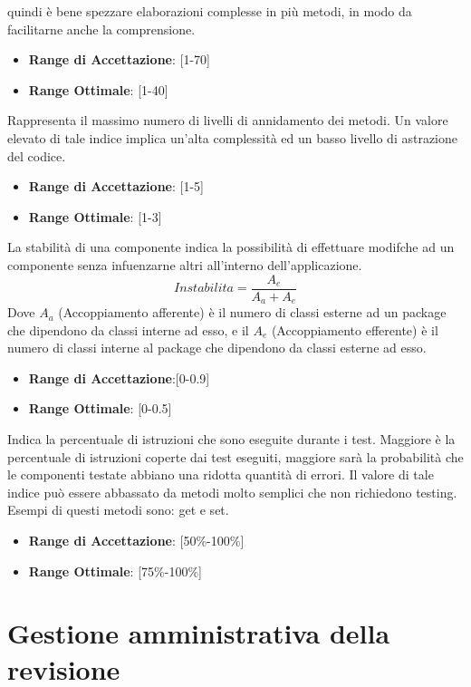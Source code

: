 \documentclass[12pt,a4paper]{article}
\begin{document}
quindi è bene spezzare elaborazioni complesse in più metodi, in modo da facilitarne anche la comprensione.
\begin{itemize}
\item \textbf{Range di Accettazione}: [1-70]
\item \textbf{Range Ottimale}: [1-40]
\end{itemize}
Rappresenta il massimo numero di livelli di annidamento dei metodi. Un valore elevato di tale indice implica un’alta complessità ed un basso livello di astrazione del codice.
\begin{itemize}
\item \textbf{Range di Accettazione}: [1-5]
\item \textbf{Range Ottimale}: [1-3]
\end{itemize}
La stabilità di una componente indica la possibilità di effettuare modifche ad un componente senza infuenzarne altri all’interno dell'applicazione.
\[Instabilita=\frac{A_e}{A_a+A_e}\]
Dove $A_a$ (Accoppiamento afferente) è il numero di classi esterne ad un package che dipendono da classi interne ad esso, e il $A_e$ (Accoppiamento efferente) è il numero di classi interne al package che dipendono da classi esterne ad esso.
\begin{itemize}
\item \textbf{Range di Accettazione}:[0-0.9]
\item \textbf{Range Ottimale}: [0-0.5]
\end{itemize}
Indica la percentuale di istruzioni che sono eseguite durante i test. Maggiore è la percentuale di istruzioni coperte dai test eseguiti, maggiore sarà la probabilità che le componenti testate abbiano una ridotta quantità di errori. Il valore di tale indice può essere abbassato da metodi molto semplici che non richiedono testing. Esempi di questi metodi sono: get e set.
\begin{itemize}
\item \textbf{Range di Accettazione}: [50\%-100\%]
\item \textbf{Range Ottimale}: [75\%-100\%]
\end{itemize}

\newpage
\section{Gestione amministrativa della revisione}
\end{document}
